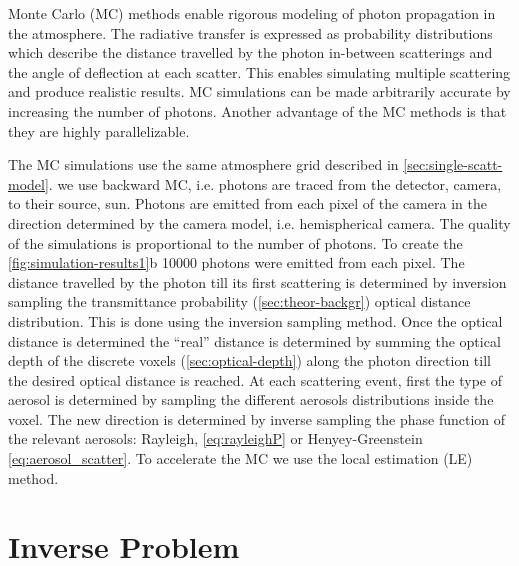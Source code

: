 \documentclass[10pt,letterpaper]{article}
\begin{document}
Monte Carlo (MC) methods enable rigorous modeling of photon
propagation in the atmosphere. The radiative transfer is expressed as
probability distributions which describe the distance travelled by the
photon in-between scatterings and the angle of deflection at each
scatter.  This enables simulating multiple scattering and produce
realistic results.  MC simulations can be made arbitrarily accurate by
increasing the number of photons.  Another advantage of the MC methods
is that they are highly parallelizable.

The MC simulations use the same atmosphere grid described in
\cref{sec:single-scatt-model}. we use backward MC, i.e. photons are
traced from the detector, camera, to their source, sun. Photons are
emitted from each pixel of the camera in the direction determined by
the camera model, i.e. hemispherical camera. The quality of the
simulations is proportional to the number of photons. To create the
\cref{fig:simulation-results1}b \num{10000} photons were emitted from
each pixel. The distance travelled by the photon till its first
scattering is determined by inversion sampling the transmittance
probability (\cref{sec:theor-backgr}) optical distance
distribution. This is done using the inversion sampling method. Once
the optical distance is determined the ``real'' distance is determined
by summing the optical depth of the discrete voxels
(\cref{sec:optical-depth}) along the photon direction till the desired
optical distance is reached.  At each scattering event, first the type
of aerosol is determined by sampling the different aerosols
distributions inside the voxel. The new direction is determined by
inverse sampling the phase function of the relevant aerosols:
Rayleigh, \cref{eq:rayleighP} or Henyey-Greenstein
\cref{eq:aerosol_scatter}.  To accelerate the MC we use the local
estimation (LE) method.



\section{Inverse Problem}
\label{sec:inverse-problem}
\end{document}
